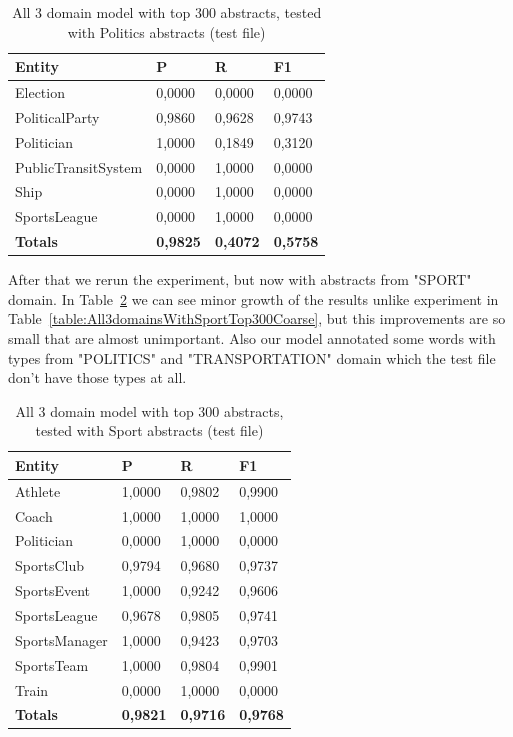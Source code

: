 \documentclass[thesis=M,english]{FITthesis}[2018/05/30]
\begin{document}
	\begin{table}[H]\centering
		\begin{tabular}{|l|l|l|l|}
			\hline {\textbf{Entity}} & {\textbf{P}} & {\textbf{R}} & {\textbf{F1}}\\\hline
				Election & 0,0000 & 0,0000 & 0,0000\\
				PoliticalParty & 0,9860 & 0,9628 & 0,9743\\
				Politician & 1,0000 & 0,1849 & 0,3120\\
				PublicTransitSystem & 0,0000 & 1,0000 & 0,0000\\
				Ship & 0,0000 & 1,0000 & 0,0000\\
				SportsLeague & 0,0000 & 1,0000 & 0,0000\\\hline
				\textbf{Totals} & \textbf{0,9825} & \textbf{0,4072} & \textbf{0,5758}\\\hline
		\end{tabular}
		\caption{All 3 domain model with top 300 abstracts, tested with Politics abstracts (test file) \label{table:All3domainsWithPoliticsTop300Fine}}
	\end{table}	

    After that we rerun the experiment, but now with abstracts from "SPORT" domain. In Table~\ref{table:All3domainsWithSportTop300Fine} we can see minor growth of the results unlike experiment in Table~\ref{table:All3domainsWithSportTop300Coarse}, but this improvements are so small that are almost unimportant. Also our model annotated some words with types from "POLITICS" and "TRANSPORTATION" domain which the test file don't have those types at all.
    
	\begin{table}[H]\centering
		\begin{tabular}{|l|l|l|l|}
			\hline {\textbf{Entity}} & {\textbf{P}} & {\textbf{R}} & {\textbf{F1}}\\\hline
				Athlete & 1,0000 & 0,9802 & 0,9900\\
				Coach & 1,0000 & 1,0000 & 1,0000\\
				Politician & 0,0000 & 1,0000 & 0,0000\\
				SportsClub & 0,9794 & 0,9680 & 0,9737\\
				SportsEvent & 1,0000 & 0,9242 & 0,9606\\
				SportsLeague & 0,9678 & 0,9805 & 0,9741\\
				SportsManager & 1,0000 & 0,9423 & 0,9703\\				
				SportsTeam & 1,0000 & 0,9804 & 0,9901\\
				Train & 0,0000 & 1,0000 & 0,0000\\\hline
				\textbf{Totals} & \textbf{0,9821} & \textbf{0,9716} & \textbf{0,9768}\\\hline
		\end{tabular}
		\caption{All 3 domain model with top 300 abstracts, tested with Sport abstracts (test file) \label{table:All3domainsWithSportTop300Fine}}
	\end{table}
	
\end{document}

